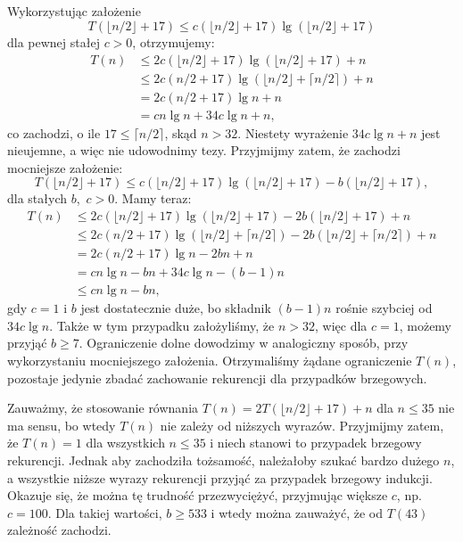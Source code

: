 \subsection{} %
Wykorzystując założenie
\[
	T(\lfloor n/2\rfloor+17) \le c(\lfloor n/2\rfloor+17)\lg(\lfloor n/2\rfloor+17)
\]
dla pewnej stałej $c>0$, otrzymujemy:
\begin{align*}
	T(n) &\le 2c(\lfloor n/2\rfloor+17)\lg(\lfloor n/2\rfloor+17)+n \\
	&\le 2c(n/2+17)\lg(\lfloor n/2\rfloor+\lceil n/2\rceil)+n \\
	&= 2c(n/2+17)\lg n+n \\
	&= cn\lg n+34c\lg n+n,
\end{align*}
co zachodzi, o ile $17\le\lceil n/2\rceil$, skąd $n>32$. Niestety wyrażenie $34c\lg n+n$ jest nieujemne, a więc nie udowodnimy tezy. Przyjmijmy zatem, że zachodzi mocniejsze założenie:
\[
	T(\lfloor n/2\rfloor+17) \le c(\lfloor n/2\rfloor+17)\lg(\lfloor n/2\rfloor+17)-b(\lfloor n/2\rfloor+17),
\]
dla stałych $b$,~$c>0$. Mamy teraz:
\begin{align*}
	T(n) &\le 2c(\lfloor n/2\rfloor+17)\lg(\lfloor n/2\rfloor+17)-2b(\lfloor n/2\rfloor+17)+n \\
	&\le 2c(n/2+17)\lg(\lfloor n/2\rfloor+\lceil n/2\rceil)-2b(\lfloor n/2\rfloor+\lceil n/2\rceil)+n \\
	&= 2c(n/2+17)\lg n-2bn+n \\
	&= cn\lg n-bn+34c\lg n-(b-1)n \\
	&\le cn\lg n-bn,
\end{align*}
gdy $c=1$ i $b$ jest dostatecznie duże, bo składnik $(b-1)n$ rośnie szybciej od $34c\lg n$. Także w tym przypadku założyliśmy, że $n>32$, więc dla $c=1$, możemy przyjąć $b\ge7$. Ograniczenie dolne dowodzimy w analogiczny sposób, przy wykorzystaniu mocniejszego założenia. Otrzymaliśmy żądane ograniczenie $T(n)$, pozostaje jedynie zbadać zachowanie rekurencji dla przypadków brzegowych.

Zauważmy, że stosowanie równania $T(n)=2T(\lfloor n/2\rfloor+17)+n$ dla $n\le35$ nie ma sensu, bo wtedy $T(n)$ nie zależy od niższych wyrazów. Przyjmijmy zatem, że $T(n)=1$ dla wszystkich $n\le35$ i niech stanowi to przypadek brzegowy rekurencji. Jednak aby zachodziła tożsamość, należałoby szukać bardzo dużego $n$, a wszystkie niższe wyrazy rekurencji przyjąć za przypadek brzegowy indukcji. Okazuje się, że można tę trudność przezwyciężyć, przyjmując większe $c$, np. $c=100$. Dla takiej wartości, $b\ge533$ i wtedy można zauważyć, że od $T(43)$ zależność zachodzi.

